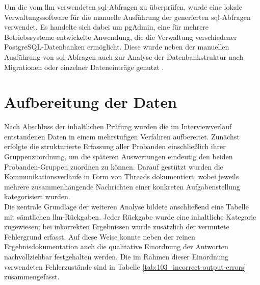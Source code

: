 Um die vom \gls{llm} verwendeten \gls{sql}-Abfragen zu überprüfen, wurde eine lokale Verwaltungssoftware für die manuelle Ausführung der generierten \gls{sql}-Abfragen verwendet.
Es handelte sich dabei um pgAdmin, eine für mehrere Betriebssysteme entwickelte Anwendung, die die Verwaltung verschiedener PostgreSQL-Datenbanken ermöglicht.
Diese wurde neben der manuellen Ausführung von \gls{sql}-Abfragen auch zur Analyse der Datenbankstruktur nach Migrationen oder einzelner Dateneinträge genutzt \cite{pgadmin2026features}.

\section{Aufbereitung der Daten}
\label{sec:datenaufbereitung}

Nach Abschluss der inhaltlichen Prüfung wurden die im Interviewverlauf entstandenen Daten in einem mehrstufigen Verfahren aufbereitet.
Zunächst erfolgte die strukturierte Erfassung aller Probanden einschließlich ihrer Gruppenzuordnung, um die späteren Auswertungen eindeutig den beiden Probanden-Gruppen zuordnen zu können.
Darauf gestützt wurden die Kommunikationsverläufe in Form von Threads dokumentiert, wobei jeweils mehrere zusammenhängende Nachrichten einer konkreten Aufgabenstellung kategorisiert wurden. \\

Die zentrale Grundlage der weiteren Analyse bildete anschließend eine Tabelle mit sämtlichen \gls{llm}-Rückgaben.
Jeder Rückgabe wurde eine inhaltliche Kategorie zugewiesen; bei inkorrekten Ergebnissen wurde zusätzlich der vermutete Fehlergrund erfasst.
Auf diese Weise konnte neben der reinen Ergebnisdokumentation auch die qualitative Einordnung der Antworten nachvollziehbar festgehalten werden.
Die im Rahmen dieser Einordnung verwendeten Fehlerzustände sind in Tabelle \ref{tab:103_incorrect-output-errors} zusammengefasst. \\

